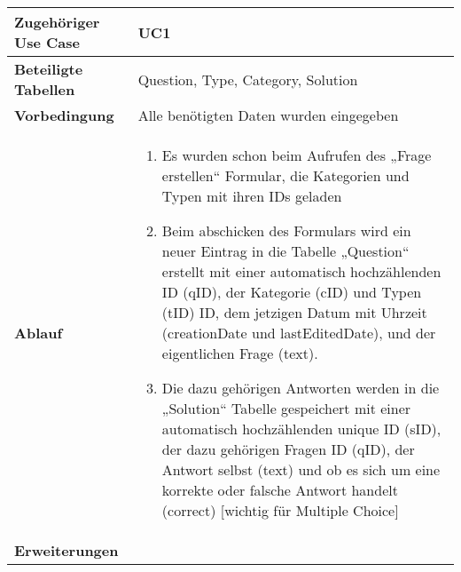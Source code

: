 \begin{table}[h]
	\begin{tabular}{|p{3cm}|p{11.06cm}|}
	\hline
		\textbf{Zugehöriger Use Case}                 &    UC1     \\ \hline
		\textbf{Beteiligte Tabellen}      &     Question, Type, Category, Solution    \\ \hline
		\textbf{Vorbedingung}              &     Alle benötigten Daten wurden eingegeben    \\ \hline
		\textbf{Ablauf}              &   
			\begin{enumerate}
			  \item Es wurden schon beim Aufrufen des „Frage erstellen“ Formular, die Kategorien und Typen mit ihren IDs geladen
			  \item Beim abschicken des Formulars wird ein neuer Eintrag in die Tabelle „Question“ erstellt mit einer automatisch hochzählenden ID (qID), der Kategorie (cID) und Typen (tID) ID, dem jetzigen Datum mit Uhrzeit (creationDate und lastEditedDate), und der eigentlichen Frage (text).
			  \item Die dazu gehörigen Antworten werden in die „Solution“ Tabelle gespeichert mit einer automatisch hochzählenden unique ID (sID), der dazu gehörigen Fragen ID (qID), der Antwort selbst (text) und ob es sich um eine korrekte oder falsche Antwort handelt (correct) [wichtig für Multiple Choice]
			\end{enumerate}
		\\ \hline
		\textbf{Erweiterungen}              &        \\ \hline
	\end{tabular}
\end{table}\FloatBarrier


